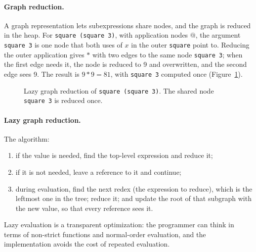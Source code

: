 \paragraph{Graph reduction.} A graph representation lets subexpressions share
nodes, and the graph is reduced in the heap. For \texttt{square (square 3)},
with application nodes $@$, the argument \texttt{square 3} is one node that
both uses of $x$ in the outer \texttt{square} point to. Reducing the outer
application gives $* $ with two edges to the same node \texttt{square 3}; when
the first edge needs it, the node is reduced to 9 and overwritten, and the
second edge sees 9. The result is $9 * 9 = 81$, with \texttt{square 3}
computed once (Figure~\ref{fig:graph-reduction}).

\begin{figure}[h]
\centering
{}
\caption{Lazy graph reduction of \texttt{square (square 3)}. The shared node \texttt{square 3} is reduced once.}
\label{fig:graph-reduction}
\end{figure}

\paragraph{Lazy graph reduction.} The algorithm:
\begin{enumerate}
  \item if the value is needed, find the top-level expression and reduce it;
  \item if it is not needed, leave a reference to it and continue;
  \item during evaluation, find the next redex (the expression to reduce),
    which is the leftmost one in the tree; reduce it; and update the root of
    that subgraph with the new value, so that every reference sees it.
\end{enumerate}
Lazy evaluation is a transparent optimization: the programmer can think in
terms of non-strict functions and normal-order evaluation, and the
implementation avoids the cost of repeated evaluation.

